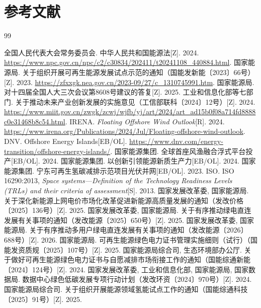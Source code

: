 \clearpage
\chapter*{参考文献}
\begin{thebibliography}{99}
\setlength{\itemsep}{0.35em}

 全国人民代表大会常务委员会. 中华人民共和国能源法[Z]. 2024. \url{https://www.npc.gov.cn/npc/c2/c30834/202411/t20241108_440884.html}.
 国家能源局. 关于组织开展可再生能源发展试点示范的通知（国能发新能〔2023〕66号）[Z]. 2023. \url{https://zfxxgk.nea.gov.cn/2023-09/27/c_1310745991.htm}.
 国家能源局. 对十四届全国人大三次会议第8608号建议的答复[Z]. 2025.
 工业和信息化部等七部门. 关于推动未来产业创新发展的实施意见（工信部联科〔2024〕12号）[Z]. 2024. \url{https://www.miit.gov.cn/zwgk/zcwj/wjfb/yj/art/2024/art_ad15b0f08a714fd8888c0e31468b8c54.html}.
 IRENA. \textit{Floating Offshore Wind Outlook}[R]. 2024. \url{https://www.irena.org/Publications/2024/Jul/Floating-offshore-wind-outlook}.
 DNV. Offshore Energy Islands[EB/OL]. \url{https://www.dnv.com/energy-transition/offshore-energy-islands/}.
 国家能源集团. 全球首座风渔融合浮式平台投产[EB/OL]. 2024.
 国家能源集团. 以创新引领能源新质生产力[EB/OL]. 2024.
 国家能源集团. 宁东可再生氢碳减排示范项目光伏并网[EB/OL]. 2023.
 ISO. ISO 16290:2013, \textit{Space systems---Definition of the Technology Readiness Levels (TRLs) and their criteria of assessment}[S]. 2013.
 国家发展改革委, 国家能源局. 关于深化新能源上网电价市场化改革促进新能源高质量发展的通知（发改价格〔2025〕136号）[Z]. 2025.
 国家发展改革委, 国家能源局. 关于有序推动绿电直连发展有关事项的通知（发改能源〔2025〕650号）[Z]. 2025.
 国家发展改革委, 国家能源局. 关于有序推动多用户绿电直连发展有关事项的通知（发改能源〔2026〕688号）[Z]. 2026.
 国家能源局. 可再生能源绿色电力证书管理实施细则（试行）（国能发资质规〔2025〕107号）[Z]. 2025.
 国家能源局综合司, 生态环境部办公厅. 关于做好可再生能源绿色电力证书与自愿减排市场衔接工作的通知（国能综通新能〔2024〕124号）[Z]. 2024.
 国家发展改革委, 工业和信息化部, 国家能源局, 国家数据局. 数据中心绿色低碳发展专项行动计划（发改环资〔2024〕970号）[Z]. 2024.
 国家能源局综合司. 关于组织开展能源领域氢能试点工作的通知（国能综通科技〔2025〕91号）[Z]. 2025.

\end{thebibliography}
